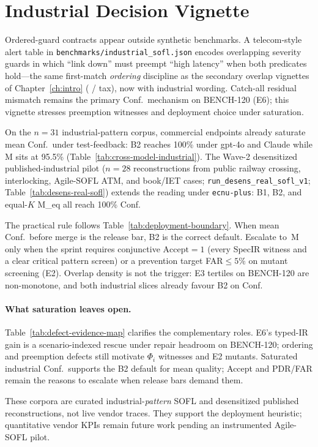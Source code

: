 \section{Industrial Decision Vignette}
\label{sec:disc:industrial-case}

Ordered-guard contracts appear outside synthetic benchmarks.
A telecom-style alert table in \texttt{benchmarks/industrial\_sofl.json}
encodes overlapping severity guards in which ``link down'' must preempt
``high latency'' when both predicates hold---the same first-match
\emph{ordering} discipline as the secondary overlap vignettes of
Chapter~\ref{ch:intro} ( / tax), now with industrial
wording.
Catch-all residual mismatch remains the primary Conf.\ mechanism on
BENCH-120 (E6); this vignette stresses preemption witnesses and deployment
choice under saturation.

On the $n{=}31$ industrial-pattern corpus, commercial endpoints already
saturate mean Conf.\ under test-feedback: B2 reaches 100\% under gpt-4o and
Claude while M sits at 95.5\% (Table~\ref{tab:cross-model-industrial}).
The Wave-2 desensitized published-industrial pilot ($n{=}28$ reconstructions
from public railway crossing, interlocking, Agile-SOFL ATM, and book/IET
cases; \texttt{run\_desens\_real\_sofl\_v1}; Table~\ref{tab:desens-real-sofl})
extends the reading under \texttt{ecnu-plus}: B1, B2, and equal-$K$ M\_eq all
reach 100\% Conf.

The practical rule follows Table~\ref{tab:deployment-boundary}.
When mean Conf.\ before merge is the release bar, B2 is the correct default.
Escalate to~M only when the sprint requires conjunctive
$\mathrm{Accept}{=}1$ (every SpecIR witness and a clear critical pattern
screen) or a prevention target FAR${\le}5\%$ on mutant screening (E2).
Overlap density is not the trigger: E3 tertiles on BENCH-120 are
non-monotone, and both industrial slices already favour B2 on Conf.

\paragraph{What saturation leaves open.}
Table~\ref{tab:defect-evidence-map} clarifies the complementary roles.
E6's typed-IR gain is a scenario-indexed rescue under repair headroom on
BENCH-120; ordering and preemption defects still motivate $\Phi_i$ witnesses
and E2 mutants.
Saturated industrial Conf.\ supports the B2 default for mean quality;
Accept and PDR/FAR remain the reasons to escalate when release bars demand
them.

These corpora are curated industrial-\emph{pattern} SOFL and desensitized
published reconstructions, not live vendor traces.
They support the deployment heuristic; quantitative vendor KPIs remain
future work pending an instrumented Agile-SOFL pilot.
